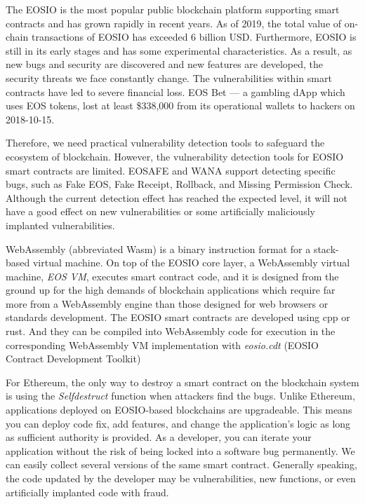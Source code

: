 \documentclass[a4paper, 10pt, conference, twocolumn]{ieeeconf}       %
\begin{document}
The EOSIO is the most popular public blockchain platform supporting smart contracts and has grown rapidly in recent years.
As of 2019, the total value of on-chain transactions of EOSIO has exceeded 6 billion USD.
Furthermore, EOSIO is still in its early stages and has some experimental characteristics.
As a result, as new bugs and security are discovered and new features are developed, the security threats we face constantly change.
The vulnerabilities within smart contracts have led to severe financial loss.
EOS Bet — a gambling dApp which uses EOS tokens, lost at least \$338,000 from its operational wallets to hackers on 2018-10-15\cite{medium:2018}.

Therefore, we need practical vulnerability detection tools to safeguard the ecosystem of blockchain.
However, the vulnerability detection tools for EOSIO smart contracts are limited.
EOSAFE\cite{272292} and WANA\cite{Wang2020WANASE} support detecting specific bugs, such as Fake EOS, Fake Receipt, Rollback, and Missing Permission Check.\cite{eosio}
Although the current detection effect has reached the expected level, it will not have a good effect on new vulnerabilities or some artificially maliciously implanted vulnerabilities.

WebAssembly (abbreviated Wasm) is a binary instruction format for a stack-based virtual machine.
On top of the EOSIO core layer, a WebAssembly virtual machine, \emph{EOS VM}, executes smart contract code, and it is designed from the ground up for the high demands of blockchain applications which require far more from a WebAssembly engine than those designed for web browsers or standards development.
The EOSIO smart contracts are developed using cpp or rust.
And they can be compiled into WebAssembly code for execution in the corresponding WebAssembly VM implementation with \emph{eosio.cdt} (EOSIO Contract Development Toolkit)

For Ethereum, the only way to destroy a smart contract on the blockchain system is using the \emph{Selfdestruct} function when attackers find the bugs.
Unlike Ethereum, applications deployed on EOSIO-based blockchains are upgradeable.
This means you can deploy code fix, add features, and change the application’s logic as long as sufficient authority is provided.
As a developer, you can iterate your application without the risk of being locked into a software bug permanently.
We can easily collect several versions of the same smart contract.
Generally speaking, the code updated by the developer may be vulnerabilities, new functions, or even artificially implanted code with fraud.
\end{document}
